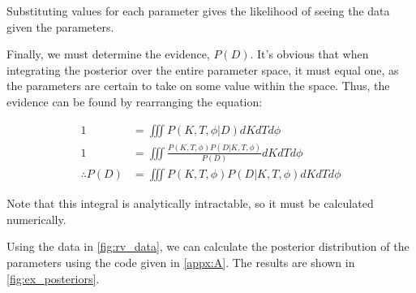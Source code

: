 \documentclass[preprint,longauthor]{aastex631}
\numberwithin{equation}{section}
\begin{document}
Substituting values for each parameter gives the likelihood of seeing the data given the parameters.

Finally, we must determine the evidence, $P(D)$. It's obvious that when integrating the posterior over the entire parameter space, it must equal one, as the parameters are certain to take on some value within the space. Thus, the evidence can be found by rearranging the equation:

\begin{align}
  1 &= \iiint P(K,T,\phi|D) dK dT d\phi\nonumber \\
  1 &= \iiint \frac{P(K,T,\phi)P(D|K,T,\phi)}{P(D)} dK dT d\phi \nonumber \\
  \therefore P(D) &= \iiint P(K,T,\phi)P(D|K,T,\phi) dK dT d\phi
\end{align}

Note that this integral is analytically intractable, so it must be calculated numerically.

Using the data in \autoref{fig:rv_data}, we can calculate the posterior distribution of the parameters using the code given in \autoref{appx:A}. The results are shown in \autoref{fig:ex_posteriors}.
\end{document}
